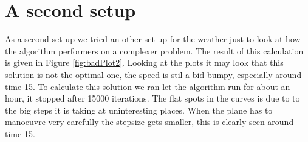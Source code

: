 \section{A second setup}


As a second set-up we tried an other set-up for the weather just to look at how the algorithm performers on a complexer problem.
The result of this calculation is given in  Figure \ref{fig:badPlot2}.
Looking at the plots it may look that this solution is not the optimal one, the speed is stil a bid bumpy, especially around time 15.
To calculate this solution we ran let the algorithm run for about an hour, it stopped after 15000 iterations.
The flat spots in the curves is due to to the big steps it is taking at uninteresting places.
When the plane has to manoeuvre very carefully the stepsize gets smaller, this is clearly seen around time 15.



